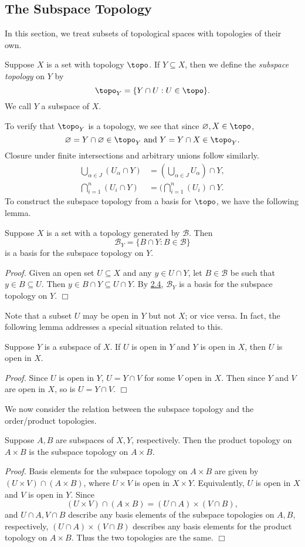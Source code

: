 \subsection{The Subspace Topology}
In this section, we treat subsets of topological spaces with topologies of their own.
\begin{definition}\label{2.13}
    Suppose $X$ is a set with topology $\topo$. If $Y \subseteq X$, then we define the {\it subspace topology} on $Y$ by
    $$\topo_Y = \{Y \cap U: U \in \topo\}.$$
    We call $Y$ a subspace of $X$.
\end{definition}
To verify that $\topo_Y$ is a topology, we see that since $\varnothing, X \in \topo$,
$$\varnothing = Y \cap \varnothing \in \topo_Y \text{ and } Y = Y \cap X \in \topo_Y.$$
Closure under finite intersections and arbitrary unions follow similarly.
\begin{align*}
    \bigcup_{\alpha \in J} (U_\alpha \cap Y) &= ( \bigcup_{\alpha \in J} U_\alpha ) \cap Y, \\
    \bigcap_{i=1}^n (U_i \cap Y) &= (\bigcap_{i=1}^n (U_i) \cap Y.
\end{align*}
To construct the subspace topology from a basis for $\topo$, we have the following lemma.
\begin{lemma}\label{2.14}
    Suppose $X$ is a set with a topology generated by $\mathcal{B}$. Then
    $$\mathcal{B}_Y = \{B \cap Y: B \in \mathcal{B}\}$$
    is a basis for the subspace topology on $Y$.
\end{lemma}
{\it Proof.} Given an open set $U \subseteq X$ and any $y \in U \cap Y$, let $B \in \mathcal{B}$ be such that $y \in B \subseteq U$. Then $y \in B \cap Y \subseteq U \cap Y$. By \hyperref[2.4]{2.4}, $\mathcal{B}_Y$ is a basis for the subspace topology on $Y.$ $\Box$

Note that a subset $U$ may be open in $Y$ but not $X$; or vice versa. In fact, the following lemma addresses a special situation related to this.
\begin{lemma}\label{2.15}
    Suppose $Y$ is a subspace of $X$. If $U$ is open in $Y$ and $Y$ is open in $X$, then $U$ is open in $X$.
\end{lemma}
{\it Proof.} Since $U$ is open in $Y$, $U = Y \cap V$ for some $V$ open in $X$. Then since $Y$ and $V$ are open in $X$, so is $U = Y \cap V$. $\Box$

We now consider the relation between the subspace topology and the order/product topologies.
\begin{theorem}\label{2.16}
    Suppose $A, B$ are subspaces of $X, Y$, respectively. Then the product topology on $A \times B$ is the subspace topology on $A \times B$.
\end{theorem}
{\it Proof.} Basis elements for the subspace topology on $A \times B$ are given by $(U \times V) \cap (A \times B)$, where $U \times V$ is open in $X \times Y$. Equivalently, $U$ is open in $X$ and $V$ is open in $Y$. Since
$$(U \times V) \cap (A \times B) = (U \cap A) \times (V \cap B),$$
and $U \cap A, V \cap B$ describe any basis elements of the subspace topologies on $A, B$, respectively, $(U \cap A) \times (V \cap B)$ describes any basis elements for the product topology on $A \times B$. Thus the two topologies are the same. $\Box$


